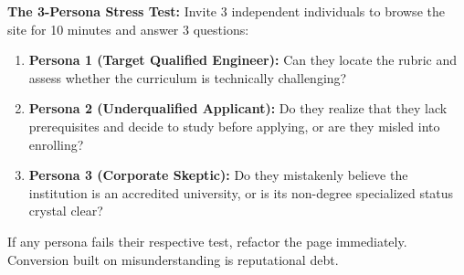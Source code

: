 \noindent\textbf{The 3-Persona Stress Test:} Invite 3 independent individuals to browse the site for 10 minutes and answer 3 questions:
\begin{enumerate}
\item \textbf{Persona 1 (Target Qualified Engineer):} Can they locate the rubric and assess whether the curriculum is technically challenging?
\item \textbf{Persona 2 (Underqualified Applicant):} Do they realize that they lack prerequisites and decide to study before applying, or are they misled into enrolling?
\item \textbf{Persona 3 (Corporate Skeptic):} Do they mistakenly believe the institution is an accredited university, or is its non-degree specialized status crystal clear?
\end{enumerate}

If any persona fails their respective test, refactor the page immediately. Conversion built on misunderstanding is reputational debt.
